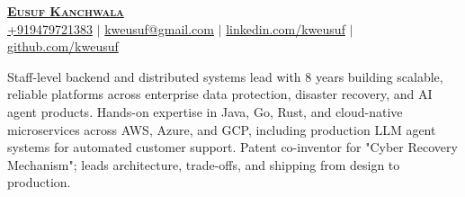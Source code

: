 \documentclass[letterpaper,11pt]{article}
\begin{document}

\begin{center}
    \textbf{\Huge \scshape \href{https://eusuf.is-a.dev/}{Eusuf Kanchwala}} \\ \vspace{1pt}
     \href{tel:+91-9479721383}{\small +919479721383} $|$ \href{mailto:kweusuf@gmail.com}{{\small kweusuf@gmail.com}} $|$ 
    \href{https://www.linkedin.com/in/kweusuf}{{\small linkedin.com/kweusuf}} $|$
    \href{https://www.github.com/kweusuf}{{\small github.com/kweusuf}}
\end{center}



\small{
    Staff-level backend and distributed systems lead with 8 years building scalable, reliable platforms across enterprise data protection, disaster recovery, and AI agent products. Hands-on expertise in Java, Go, Rust, and cloud-native microservices across AWS, Azure, and GCP, including production LLM agent systems for automated customer support. Patent co-inventor for "Cyber Recovery Mechanism"; leads architecture, trade-offs, and shipping from design to production.
}


%
\end{document}
